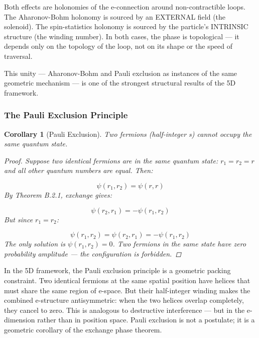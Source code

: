 \documentclass[aps,prd,preprint,superscriptaddress,longbibliography,floatfix]{revtex4-2}
\newtheorem{corollary}[theorem]{Corollary}
\theoremstyle{remark}
\begin{document}
Both effects are holonomies of the e-connection around non-contractible loops. The Aharonov-Bohm holonomy is sourced by an EXTERNAL field (the solenoid). The spin-statistics holonomy is sourced by the particle's INTRINSIC structure (the winding number). In both cases, the phase is topological --- it depends only on the topology of the loop, not on its shape or the speed of traversal.

This unity --- Aharonov-Bohm and Pauli exclusion as instances of the same geometric mechanism --- is one of the strongest structural results of the 5D framework.


\subsubsection{The Pauli Exclusion Principle}

\begin{corollary}[Pauli Exclusion]
\label{cor:B22} \textit{Two fermions (half-integer s) cannot occupy the same quantum state.}

\begin{proof}

Suppose two identical fermions are in the same quantum state: $r_{1} = r_{2} = r$ and all other quantum numbers are equal. Then:


\begin{equation}
    \psi(r_{1}, r_{2}) = \psi(r, r)
\end{equation}
By Theorem B.2.1, exchange gives:


\begin{equation}
    \psi(r_{2}, r_{1}) = -\psi(r_{1}, r_{2})
\end{equation}
But since $r_{1} = r_{2}$:


\begin{equation}
    \psi(r_{1}, r_{2}) = \psi(r_{2}, r_{1}) = -\psi(r_{1}, r_{2})
\end{equation}
The only solution is $\psi(r_{1}, r_{2}) = 0$. Two fermions in the same state have zero probability amplitude --- the configuration is forbidden. \end{proof}
\end{corollary}

In the 5D framework, the Pauli exclusion principle is a geometric packing constraint. Two identical fermions at the same spatial position have helices that must share the same region of e-space. But their half-integer winding makes the combined e-structure antisymmetric: when the two helices overlap completely, they cancel to zero. This is analogous to destructive interference --- but in the e-dimension rather than in position space. Pauli exclusion is not a postulate; it is a geometric corollary of the exchange phase theorem.
\end{document}
